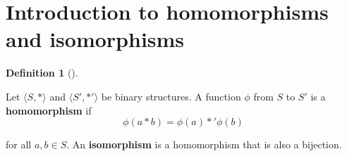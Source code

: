 \documentclass[10pt,]{book}
\newcommand{\terminology}[1]{\textbf{#1}}
\theoremstyle{plain}
\theoremstyle{definition}
\newtheorem{definition}[theorem]{Definition}
\theoremstyle{definition}
\theoremstyle{definition}
\theoremstyle{definition}
\numberwithin{equation}{section}
\begin{document}
\section[{Introduction to homomorphisms and isomorphisms}]{Introduction to homomorphisms and isomorphisms}\label{section-11}
\begin{definition}[{}]\label{definition-30}

        Let \(\langle S,*\rangle\) and \(\langle S',*'\rangle\) be binary structures. A
        function \(\phi\) from \(S\) to \(S'\) is a \terminology{homomorphism} if
\begin{equation*}

          \phi(a* b)=\phi(a)*'\phi(b)
        
\end{equation*}

        for all \(a,b\in S\). An \terminology{isomorphism} is a homomorphism that is also a bijection.
\end{definition}
\end{document}
